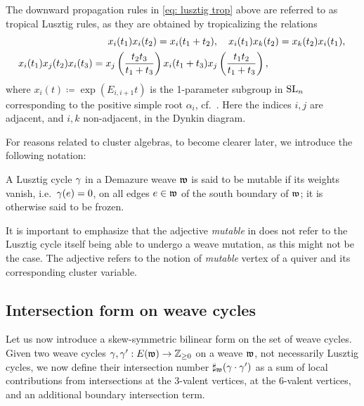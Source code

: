 \begin{remark} The downward propagation rules in \cref{eq: lusztig trop} above are referred to as tropical Lusztig rules, as they are obtained by tropicalizing the relations
\begin{multline*}
\label{eq: lusztig trop2}
\qquad \qquad \qquad \qquad \quad x_i(t_1)x_i(t_2)=x_i(t_1+t_2), \quad x_i(t_1)x_k(t_2)=x_k(t_2)x_i(t_1),\\ x_i(t_1)x_j(t_2)x_i(t_3)=
x_j\left(\frac{t_2t_3}{t_1+t_3}\right)x_i(t_1+t_3)x_j\left(\frac{t_1t_2}{t_1+t_3}\right), \hskip 2.8cm
\end{multline*}
\noindent where $x_i(t)\coloneqq \exp(E_{i,i+1}t)$ is the 1-parameter subgroup in $\operatorname{SL}_n$ corresponding to the positive simple root $\alpha_i$, cf.~\cite[Proposition 2.5]{Lusztig}. Here the indices $i,j$ are adjacent, and $i,k$ non-adjacent, in the Dynkin diagram.\sbs
\end{remark}

\noindent For reasons related to cluster algebras, to become clearer later, we introduce the following notation:

\begin{definition}\label{def:mutable_frozen}
A Lusztig cycle $\gamma$ in a Demazure weave $\mathfrak{w}$ is said to be mutable if its weights vanish, i.e.~$\gamma(e)=0$, on all edges $e\in\mathfrak{w}$ of the south boundary of $\mathfrak{w}$; it is otherwise said to be frozen.\sbs
\end{definition}
It is important to emphasize that the adjective {\it mutable} in  does not refer to the Lusztig cycle itself being able to undergo a weave mutation, as this might not be the case. The adjective refers to the notion of {\it mutable} vertex of a quiver and its corresponding cluster variable.


\subsection{Intersection form on weave cycles}\label{ssec:intersection_cycles} Let us now introduce a skew-symmetric bilinear form on the set of weave cycles. Given two weave cycles $\gamma,\gamma': E(\mathfrak{w})\to\mathbb{Z}_{\geq0}$ on a weave $\mathfrak{w}$, not necessarily Lusztig cycles, we now define their intersection number $\sharp_{\mathfrak{w}}(\gamma \cdot \gamma')$ as a sum of local contributions from intersections at the 3-valent vertices, at the 6-valent vertices, and an additional boundary intersection term.

